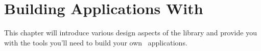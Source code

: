 \chapter{Building Applications With \vtyui}

This chapter will introduce various design aspects of the library and
provide you with the tools you'll need to build your own
\vtyui\ applications.






